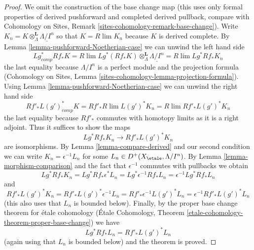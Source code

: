 \begin{proof}
We omit the construction of the base change map (this uses only
formal properties of derived pushforward and completed derived pullback,
compare with
Cohomology on Sites, Remark \ref{sites-cohomology-remark-base-change}).
Write $K_n = K \otimes^\mathbf{L}_\Lambda \underline{\Lambda/I^n}$
so that $K = R\lim K_n$ because $K$ is derived complete.
By Lemma \ref{lemma-pushforward-Noetherian-case} we can unwind the left
hand side
$$
Lg_{comp}^* Rf_* K =
R\lim Lg^*(Rf_*K)\otimes^\mathbf{L}_\Lambda \underline{\Lambda/I^n} =
R\lim Lg^* Rf_* K_n
$$
the last equality because $\Lambda/I^n$ is a perfect module and
the projection formula (Cohomology on Sites, Lemma
\ref{sites-cohomology-lemma-projection-formula}).
Using Lemma \ref{lemma-pushforward-Noetherian-case} we can unwind the right
hand side
$$
Rf'_* L(g')^*_{comp} K =
Rf'_* R\lim L(g')^* K_n  =
R\lim Rf'_* L(g')^* K_n
$$
the last equality because $Rf'_*$ commutes with homotopy limits as it is
a right adjoint. Thus it suffices to show the maps
$$
Lg^* Rf_* K_n \longrightarrow Rf'_* L(g')^* K_n
$$
are isomorphisms. By Lemma \ref{lemma-compare-derived} and our second
condition we can write $K_n = \epsilon^{-1}L_n$ for some
$L_n \in D^+(X_\etale, \Lambda/I^n)$. By Lemma \ref{lemma-morphism-comparison}
and the fact that $\epsilon^{-1}$ commutes with pullbacks
we obtain
$$
Lg^* Rf_* K_n =
Lg^* Rf_* \epsilon^*L_n =
Lg^* \epsilon^{-1} Rf_* L_n =
\epsilon^{-1} Lg^* Rf_* L_n
$$
and
$$
Rf'_* L(g')^* K_n =
Rf'_* L(g')^* \epsilon^{-1} L_n =
Rf'_* \epsilon^{-1} L(g')^* L_n =
\epsilon^{-1} Rf'_* L(g')^* L_n
$$
(this also uses that $L_n$ is bounded below).
Finally, by the proper base change theorem for \'etale cohomology
(\'Etale Cohomology, Theorem
\ref{etale-cohomology-theorem-proper-base-change}) we have
$$
Lg^* Rf_* L_n = Rf'_* L(g')^* L_n
$$
(again using that $L_n$ is bounded below)
and the theorem is proved.
\end{proof}
















